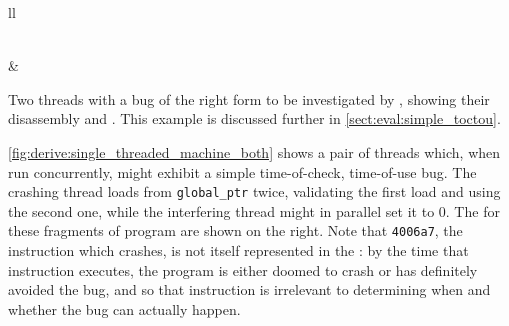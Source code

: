 \begin{sanefig}
\begin{tabular}{ll}
{\begin{tikzpicture}[minimum height=1cm,minimum width=6.4cm, node distance = 0.5]
        \node (l6) at (-1.9, -4) [stateTerminal,minimum width=3.5cm] {L6: \stCrash};
        \node (l3) at (1.9, -4) [stateTerminal,minimum width=3.5cm] {L3: \stSurvive };
        \node [above = -1.1 of l3] {};
        \draw[->] (l1) -- (l2);
        \draw[->,ifTrue] (l2.east) to [bend left=45] (l3);
        \draw[->,ifFalse] (l2) -- (l4);
        \draw[->] (l4) -- (l5);
        \draw[->,ifFalse] (l5) -- (l3);
        \draw[->,ifTrue] (l5) -- (l6);
      \end{tikzpicture}\hspace{-15mm}
      \label{fig:derive:single_threaded_machine}
    }
    \\
     &
    \\
  \end{tabular}
  \vspace{-12pt}
  \caption{Two threads with a bug of the right form to be investigated
    by {\technique}, showing their disassembly and {\StateMachines}.
    This example is discussed further in
    \autoref{sect:eval:simple_toctou}.}
  \label{fig:derive:single_threaded_machine_both}
\end{sanefig}

\noindent
\autoref{fig:derive:single_threaded_machine_both} shows a pair of
threads which, when run concurrently, might exhibit a simple
time-of-check, time-of-use bug.  The crashing thread loads from
\texttt{global\_ptr} twice, validating the first load and using the
second one, while the interfering thread might in parallel set it to
0.  The {\StateMachines} for these fragments of program are shown on
the right.  Note that \verb|4006a7|, the instruction which crashes, is
not itself represented in the {\StateMachine}: by the time that
instruction executes, the program is either doomed to crash or has
definitely avoided the bug, and so that instruction is irrelevant to
determining when and whether the bug can actually happen.

